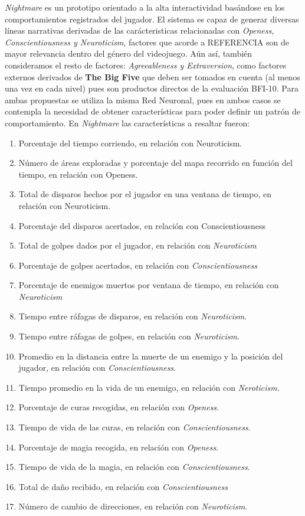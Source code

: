 \documentclass[conference]{IEEEtran}
\begin{document}
\textit{Nightmare} es un prototipo orientado a la alta interactividad basándose en los comportamientos registrados del jugador. El sistema es capaz de generar diversas líneas narrativas derivadas de las carácteristicas relacionadas con \textit{Openess, Conscientiousness y Neuroticism}, factores que acorde a REFERENCIA son de mayor relevancia dentro del género del videojuego. Aún así, también consideramos el resto de factores: \textit{Agreeableness y Extraversion}, como factores externos derivados de \textbf{The Big Five} que  deben ser tomados en cuenta (al menos una vez en cada nivel) pues son productos directos de la evaluación BFI-10. Para ambas propuestas se utiliza la misma Red Neuronal, pues en ambos casos se contempla la necesidad de obtener características para poder definir un patrón de comportamiento. En \textit{Nightmare} las características a resaltar fueron: 

\begin{enumerate}
\item Porcentaje del tiempo corriendo, en relación con Neuroticism.
\item Número de áreas exploradas y porcentaje del mapa recorrido en función del tiempo, en  relación con Openess.
\item Total de disparos hechos por el jugador en una ventana de tiempo, en relación con Neuroticism.
\item Porcentaje del disparos acertados, en relación con Conscientiousness
\item Total de golpes dados por el jugador, en relación con \textit{Neuroticism}
\item Porcentaje de golpes acertados, en relación con \textit{Conscientiousness}
\item Porcentaje de enemigos muertos por ventana de tiempo, en relación con \textit{Neuroticism}
\item Tiempo entre ráfagas de disparos, en relación con \textit{Neuroticism}.
\item Tiempo entre ráfagas de golpes, en relación con \textit{Neuroticism}.
\item Promedio en la distancia entre la muerte de un enemigo y la posición del jugador, en relación con \textit{Conscientiousness}.
\item Tiempo promedio en la vida de un enemigo, en relación con \textit{Neroticism}.
\item Porcentaje de curas recogidas, en relación con \textit{Openess}.
\item Tiempo de vida de las curas, en relación con \textit{Conscientiousness}.
\item Porcentaje de magia recogida, en relación con \textit{Openess}.
\item Tiempo de vida de la magia, en relación con \textit{Conscientiousness}.
\item Total de daño recibido, en relación con \textit{Conscientiousness}
\item Número de cambio de direcciones, en relación con \textit{Neuroticism}.

\end{enumerate}
\end{document}
